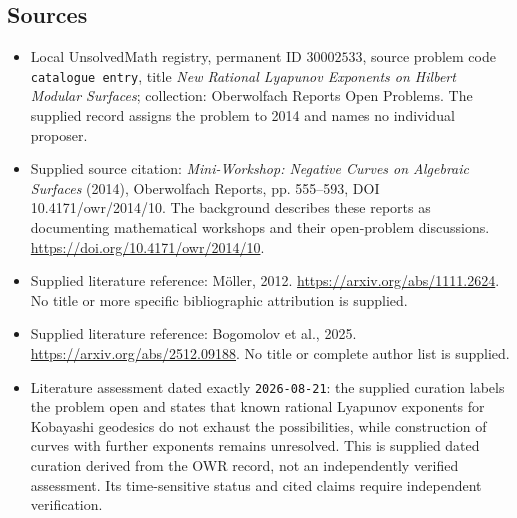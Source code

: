 \documentclass[11pt]{article}
\begin{document}
\subsection{Sources}
\begin{itemize}
\item Local UnsolvedMath registry, permanent ID \(30002533\), source problem code \texttt{catalogue entry}, title \emph{New Rational Lyapunov Exponents on Hilbert Modular Surfaces}; collection: Oberwolfach Reports Open Problems. The supplied record assigns the problem to 2014 and names no individual proposer.
\item Supplied source citation: \emph{Mini-Workshop: Negative Curves on Algebraic Surfaces} (2014), Oberwolfach Reports, pp. 555--593, DOI 10.4171/owr/2014/10. The background describes these reports as documenting mathematical workshops and their open-problem discussions. \url{https://doi.org/10.4171/owr/2014/10}.
\item Supplied literature reference: M\"oller, 2012. \url{https://arxiv.org/abs/1111.2624}. No title or more specific bibliographic attribution is supplied.
\item Supplied literature reference: Bogomolov et al., 2025. \url{https://arxiv.org/abs/2512.09188}. No title or complete author list is supplied.
\item Literature assessment dated exactly \texttt{2026-08-21}: the supplied curation labels the problem open and states that known rational Lyapunov exponents for Kobayashi geodesics do not exhaust the possibilities, while construction of curves with further exponents remains unresolved. This is supplied dated curation derived from the OWR record, not an independently verified assessment. Its time-sensitive status and cited claims require independent verification.
\end{itemize}
\end{document}
